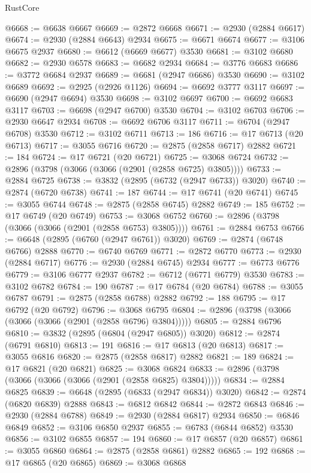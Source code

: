 \begin{lexlean}{RustCore}
\begin{coremodule}
@6668 := @6638 @6667
@6669 := @2872 @6668
@6671 := @2930 (@2884 @6617)
@6674 := @2930 (@2884 @6643) @2934
@6675 := @6671 @6674
@6677 := @3106 @6675 @2937
@6680 := @6612 (@6669 @6677) @3530
@6681 := @3102 @6680
@6682 := @2930 @6578
@6683 := @6682 @2934
@6684 := @3776 @6683
@6686 := @3772 @6684 @2937
@6689 := @6681 (@2947 @6686) @3530
@6690 := @3102 @6689
@6692 := @2925 (@2926 @1126)
@6694 := @6692 @3777 @3117
@6697 := @6690 (@2947 @6694) @3530
@6698 := @3102 @6697
@6700 := @6692 @6683 @3117
@6703 := @6698 (@2947 @6700) @3530
@6704 := @3102 @6703
@6706 := @2930 @6647 @2934
@6708 := @6692 @6706 @3117
@6711 := @6704 (@2947 @6708) @3530
@6712 := @3102 @6711
@6713 := 186
@6716 := @17 @6713 (@20 @6713)
@6717 := @3055 @6716
@6720 := @2875 (@2858 @6717) @2882
@6721 := 184
@6724 := @17 @6721 (@20 @6721)
@6725 := @3068 @6724
@6732 := @2896 (@3798 (@3066 (@3066 (@2901 (@2858 @6725) @3805))))
@6733 := @2884 @6725
@6738 := @3832 (@2895 (@6732 (@2947 @6733)) @3020)
@6740 := @2874 (@6720 @6738)
@6741 := 187
@6744 := @17 @6741 (@20 @6741)
@6745 := @3055 @6744
@6748 := @2875 (@2858 @6745) @2882
@6749 := 185
@6752 := @17 @6749 (@20 @6749)
@6753 := @3068 @6752
@6760 := @2896 (@3798 (@3066 (@3066 (@2901 (@2858 @6753) @3805))))
@6761 := @2884 @6753
@6766 := @6648 (@2895 (@6760 (@2947 @6761)) @3020)
@6769 := @2874 (@6748 @6766) @2888
@6770 := @6740 @6769
@6771 := @2872 @6770
@6773 := @2930 (@2884 @6717)
@6776 := @2930 (@2884 @6745) @2934
@6777 := @6773 @6776
@6779 := @3106 @6777 @2937
@6782 := @6712 (@6771 @6779) @3530
@6783 := @3102 @6782
@6784 := 190
@6787 := @17 @6784 (@20 @6784)
@6788 := @3055 @6787
@6791 := @2875 (@2858 @6788) @2882
@6792 := 188
@6795 := @17 @6792 (@20 @6792)
@6796 := @3068 @6795
@6804 := @2896 (@3798 (@3066 (@3066 (@3066 (@2901 (@2858 @6796) @3804)))))
@6805 := @2884 @6796
@6810 := @3832 (@2895 (@6804 (@2947 @6805)) @3020)
@6812 := @2874 (@6791 @6810)
@6813 := 191
@6816 := @17 @6813 (@20 @6813)
@6817 := @3055 @6816
@6820 := @2875 (@2858 @6817) @2882
@6821 := 189
@6824 := @17 @6821 (@20 @6821)
@6825 := @3068 @6824
@6833 := @2896 (@3798 (@3066 (@3066 (@3066 (@2901 (@2858 @6825) @3804)))))
@6834 := @2884 @6825
@6839 := @6648 (@2895 (@6833 (@2947 @6834)) @3020)
@6842 := @2874 (@6820 @6839) @2888
@6843 := @6812 @6842
@6844 := @2872 @6843
@6846 := @2930 (@2884 @6788)
@6849 := @2930 (@2884 @6817) @2934
@6850 := @6846 @6849
@6852 := @3106 @6850 @2937
@6855 := @6783 (@6844 @6852) @3530
@6856 := @3102 @6855
@6857 := 194
@6860 := @17 @6857 (@20 @6857)
@6861 := @3055 @6860
@6864 := @2875 (@2858 @6861) @2882
@6865 := 192
@6868 := @17 @6865 (@20 @6865)
@6869 := @3068 @6868

\end{coremodule}
\end{lexlean}
